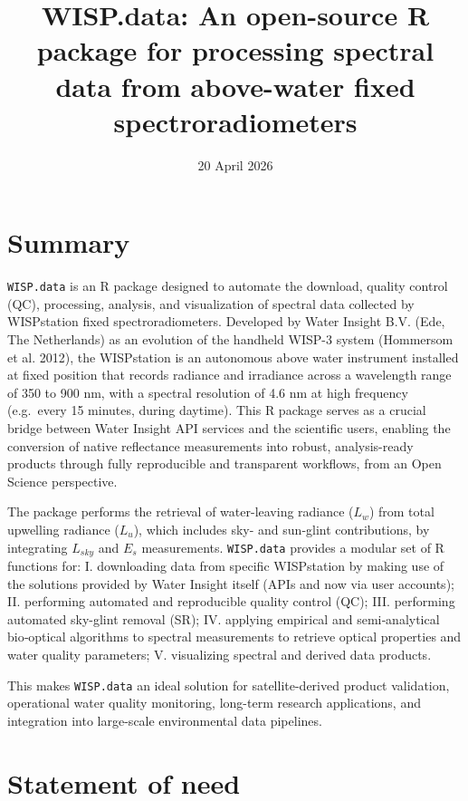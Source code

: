 \documentclass[
]{article}
\title{WISP.data: An open-source R package for processing spectral data
from above-water fixed spectroradiometers}
\author{}
\date{\vspace{-2.5em}20 April 2026}
\begin{document}
\maketitle

\section{Summary}\label{summary}

\texttt{WISP.data} is an R package designed to automate the download,
quality control (QC), processing, analysis, and visualization of
spectral data collected by WISPstation fixed spectroradiometers.
Developed by Water Insight B.V. (Ede, The Netherlands) as an evolution
of the handheld WISP-3 system (Hommersom et al. 2012), the WISPstation
is an autonomous above water instrument installed at fixed position that
records radiance and irradiance across a wavelength range of 350 to 900
nm, with a spectral resolution of 4.6 nm at high frequency (e.g.~every
15 minutes, during daytime). This R package serves as a crucial bridge
between Water Insight API services and the scientific users, enabling
the conversion of native reflectance measurements into robust,
analysis-ready products through fully reproducible and transparent
workflows, from an Open Science perspective.

The package performs the retrieval of water-leaving radiance (\(L_w\))
from total upwelling radiance (\(L_u\)), which includes sky- and
sun-glint contributions, by integrating \(L_{sky}\) and \(E_s\)
measurements. \texttt{WISP.data} provides a modular set of R functions
for: I. downloading data from specific WISPstation by making use of the
solutions provided by Water Insight itself (APIs and now via user
accounts); II. performing automated and reproducible quality control
(QC); III. performing automated sky-glint removal (SR); IV. applying
empirical and semi‑analytical bio‑optical algorithms to spectral
measurements to retrieve optical properties and water quality
parameters; V. visualizing spectral and derived data products.

This makes \texttt{WISP.data} an ideal solution for satellite-derived
product validation, operational water quality monitoring, long-term
research applications, and integration into large-scale environmental
data pipelines.

\section{Statement of need}\label{statement-of-need}
\end{document}

